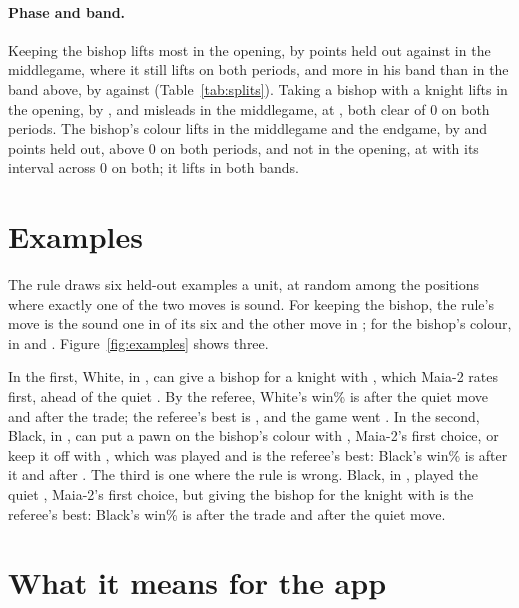 \documentclass[11pt]{article}
\begin{document}
\paragraph{Phase and band.} Keeping the bishop lifts most in the opening, by \BfnOpenHeld{} points
held out against \BfnMiddleHeld{} in the middlegame, where it still lifts on both periods, and more
in his band than in the band above, by \BfnHisHeld{} against \BfnAboveHeld{}
(Table~\ref{tab:splits}). Taking a bishop with a knight lifts in the opening, by \NfbOpenHeld, and
misleads in the middlegame, at \NfbMiddleHeld, both clear of 0 on both periods. The bishop's colour
lifts in the middlegame and the endgame, by \ColMiddleHeld{} and \ColEndHeld{} points held out,
above 0 on both periods, and not in the opening, at \ColOpenHeld{} with its interval across 0 on
both; it lifts in both bands.

\SplitTable

\section{Examples}

The rule draws six held-out examples a unit, at random among the positions where exactly one of
the two moves is sound. For keeping the bishop, the rule's move is the sound one in
\BfnExamplesF{} of its six and the other move in \BfnExamplesB; for the bishop's colour, in
\ColExamplesF{} and \ColExamplesB. Figure~\ref{fig:examples} shows three.

In the first, White, in \BfnFourBand, can give a bishop for a knight with \BfnFourB, which Maia-2
rates first, ahead of the quiet \BfnFourF. By the referee, White's win\% is \BfnFourFWin{} after
the quiet move and \BfnFourBWin{} after the trade; the referee's best is \BfnFourBest, and the game went
\BfnFourPlayed. In the second, Black, in \ColTwoBand, can put a pawn on the bishop's colour with
\ColTwoB, Maia-2's first choice, or keep it off with \ColTwoF, which was played and is the referee's
best: Black's win\% is \ColTwoFWin{} after it and \ColTwoBWin{} after \ColTwoB. The third is one
where the rule is wrong. Black, in \BfnSixBand, played the quiet \BfnSixF, Maia-2's first choice,
but giving the bishop for the knight with \BfnSixB{} is the referee's best: Black's win\% is
\BfnSixBWin{} after the trade and \BfnSixFWin{} after the quiet move.

\ExampleFigure

\section{What it means for the app}
\end{document}
